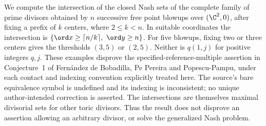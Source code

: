 
We compute the intersection of the closed Nash sets of the complete family
of prime divisors obtained by \(n\) successive free point blowups over
\((\C^2,0)\), after fixing a prefix of \(k\) centers, where \(2\leq k<n\).
In suitable coordinates the intersection is
\(\{\ord x\geq\lceil n/k\rceil,\ \ord y\geq n\}\).
For five blowups, fixing two or three centers gives the thresholds
\((3,5)\) or \((2,5)\). Neither is \(q(1,j)\) for positive integers \(q,j\).
These examples disprove the specified-reference-multiple assertion in
Conjecture~1 of Fern\'andez de Bobadilla, Pe Pereira and Popescu-Pampu,
under each contact and indexing convention explicitly treated here.
The source's bare equivalence symbol is undefined and its indexing is
inconsistent; no unique author-intended correction is asserted.
The intersections are themselves maximal divisorial sets for other
toric divisors. Thus the result does not disprove an assertion allowing
an arbitrary divisor, or solve the generalized Nash problem.
